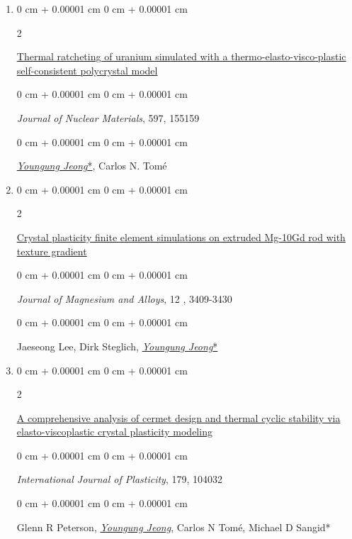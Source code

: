 \documentclass[10pt, letterpaper]{article}
\newenvironment{onecolentry}{
    \begin{adjustwidth}{
        0 cm + 0.00001 cm
    }{
        0 cm + 0.00001 cm
    }
}{
    \end{adjustwidth}
} %
\newenvironment{twocolentry}[2][]{
    \onecolentry
    \def\secondColumn{#2}
    \setcolumnwidth{\fill, 4.5 cm}
    \begin{paracol}{2}
}{
    \switchcolumn \raggedleft \secondColumn
    \end{paracol}
    \endonecolentry
} %
\begin{document}
\begin{enumerate}
        \item
        \begin{twocolentry}{2024}
            \href{https://doi.org/10.1016/j.jnucmat.2024.155159}{Thermal ratcheting of uranium simulated with a thermo-elasto-visco-plastic self-consistent polycrystal model}
        \end{twocolentry}
        \begin{onecolentry}
            {\it Journal of Nuclear Materials}, 597, 155159
        \end{onecolentry}
        \begin{onecolentry}
            {\underline{\textit{Youngung Jeong}*}}, Carlos N. Tomé
        \end{onecolentry}
        \vspace{0.10 cm}

        \item
        \begin{twocolentry}{2024}
            \href{https://doi.org/10.1016/j.jma.2024.08.009}{Crystal plasticity finite element simulations on extruded Mg-10Gd rod with texture gradient}
        \end{twocolentry}
        \begin{onecolentry}
            {\it Journal of Magnesium and Alloys}, 12 , 3409-3430
        \end{onecolentry}
        \begin{onecolentry}
            Jaeseong Lee, Dirk Steglich, {\underline{\textit{Youngung Jeong}*}}
        \end{onecolentry}
        \vspace{0.10 cm}

        \item
        \begin{twocolentry}{2024}
            \href{https://doi.org/10.1016/j.ijplas.2024.104032}{A comprehensive analysis of cermet design and thermal cyclic stability via elasto-viscoplastic crystal plasticity modeling}
        \end{twocolentry}
        \begin{onecolentry}
            {\it International Journal of Plasticity}, 179, 104032
        \end{onecolentry}
        \begin{onecolentry}
            Glenn R Peterson, {\underline{\textit{Youngung Jeong}}}, Carlos N Tomé, Michael D Sangid*
        \end{onecolentry}
        \vspace{0.10 cm}


\end{enumerate}
\end{document}
